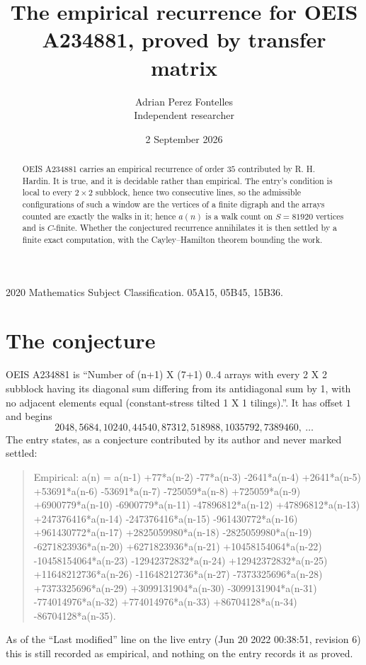 \documentclass[11pt,a4paper]{article}
\title{The empirical recurrence for OEIS A234881, proved by transfer matrix}
\author{Adrian Perez Fontelles\\ \small Independent researcher}
\date{2 September 2026}
\theoremstyle{plain}
\theoremstyle{definition}
\begin{document}
\maketitle

\begin{abstract}
OEIS A234881 carries an empirical recurrence of order $35$ contributed by R. H. Hardin. It is
true, and it is decidable rather than empirical. The entry's condition is local to every $2\times2$ subblock, hence two consecutive lines, so
the admissible configurations of such a window are the vertices of a finite digraph and the
arrays counted are exactly the walks in it; hence $a(n)$ is a walk count on $S=81920$ vertices
and is $C$-finite. Whether the conjectured recurrence annihilates it is then settled by a
finite exact computation, with the Cayley--Hamilton theorem bounding the work.
\end{abstract}

\noindent\small 2020 Mathematics Subject Classification. 05A15, 05B45, 15B36.\normalsize

\section{The conjecture}

OEIS A234881 is ``Number of (n+1) X (7+1) 0..4 arrays with every 2 X 2 subblock having its diagonal sum differing from its antidiagonal sum by 1, with no adjacent elements equal (constant-stress tilted 1 X 1 tilings).''. It has offset $1$ and begins
\[
2048, 5684, 10240, 44540, 87312, 518988, 1035792, 7389460,\ \dots
\]
The entry states, as a conjecture contributed by its author and never marked settled:
\begin{quote}
Empirical: a(n) = a(n-1) +77*a(n-2) -77*a(n-3) -2641*a(n-4) +2641*a(n-5) +53691*a(n-6) -53691*a(n-7) -725059*a(n-8) +725059*a(n-9) +6900779*a(n-10) -6900779*a(n-11) -47896812*a(n-12) +47896812*a(n-13) +247376416*a(n-14) -247376416*a(n-15) -961430772*a(n-16) +961430772*a(n-17) +2825059980*a(n-18) -2825059980*a(n-19) -6271823936*a(n-20) +6271823936*a(n-21) +10458154064*a(n-22) -10458154064*a(n-23) -12942372832*a(n-24) +12942372832*a(n-25) +11648212736*a(n-26) -11648212736*a(n-27) -7373325696*a(n-28) +7373325696*a(n-29) +3099131904*a(n-30) -3099131904*a(n-31) -774014976*a(n-32) +774014976*a(n-33) +86704128*a(n-34) -86704128*a(n-35).
\end{quote}
As of the ``Last modified'' line on the live entry (Jun 20 2022 00:38:51, revision 6) this is still
recorded as empirical, and nothing on the entry records it as proved.
\end{document}
